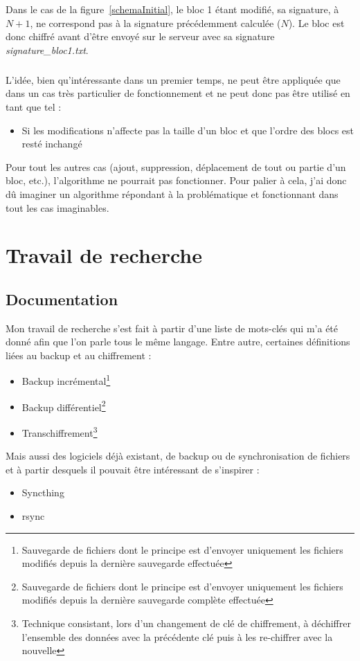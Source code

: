 \documentclass[a4paper,10pt, twoside]{report}
\begin{document}
\begin{spacing}{1.2}
Dans le cas de la figure~\ref{schemaInitial}, le bloc 1 étant modifié, sa
signature, à \(N + 1\), ne correspond pas à la signature précédemment
calculée (\(N\)). Le bloc est donc chiffré avant d'être envoyé sur le
serveur avec sa signature \textit{signature\_bloc1.txt}.

\subparagraph{}
L'idée, bien qu'intéressante dans un premier temps, ne peut être
appliquée que dans un cas très particulier de fonctionnement et ne peut
donc pas être utilisé en tant que tel :
\begin{itemize}
 \item Si les modifications n'affecte pas la taille d'un bloc et que l'ordre
 des blocs est resté inchangé
\end{itemize}

Pour tout les autres cas (ajout, suppression, déplacement de tout ou partie
d'un bloc, etc.), l'algorithme ne pourrait pas fonctionner. Pour palier à
cela, j'ai donc dû imaginer un algorithme répondant à la problématique
et fonctionnant dans tout les cas imaginables.

\section{Travail de recherche}
\label{secTravailRecherche}
\subsection{Documentation}
Mon travail de recherche s'est fait à partir d'une liste de mots-clés qui
m'a été donné afin que l'on parle tous le même langage. Entre autre,
certaines définitions liées au backup et au chiffrement :
\begin{itemize}
 \item Backup incrémental\footnote{Sauvegarde de fichiers dont le principe est
 d'envoyer uniquement les fichiers modifiés depuis la dernière sauvegarde
 effectuée}
 \item Backup différentiel\footnote{Sauvegarde de fichiers dont le principe
 est d'envoyer uniquement les fichiers modifiés depuis la dernière
 sauvegarde complète effectuée}
 \item Transchiffrement\footnote{Technique consistant, lors d'un changement
 de clé de chiffrement, à déchiffrer l'ensemble des données avec la
 précédente clé puis à les re-chiffrer avec la nouvelle}
\end{itemize}

Mais aussi des logiciels déjà existant, de backup ou de synchronisation de
fichiers et à partir desquels il pouvait être intéressant de s'inspirer :
\begin{itemize}
 \item Syncthing~\cite{refSyncthing}
 \item rsync~\cite{refRsync}
\end{itemize}


\end{spacing}
\end{document}
